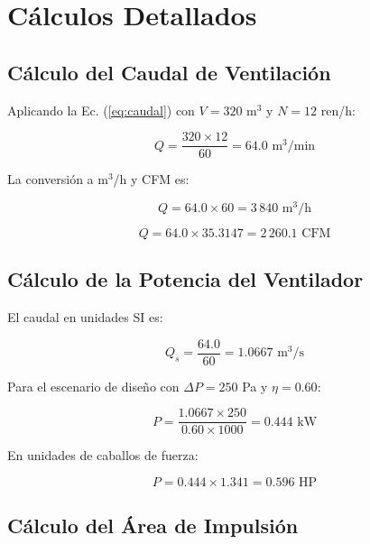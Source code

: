 \appendix
\section{Cálculos Detallados}
\label{appendix:calculations}

\subsection{Cálculo del Caudal de Ventilación}

Aplicando la Ec. (\ref{eq:caudal}) con $V = 320$ m$^3$ y $N = 12$ ren/h:

\begin{equation}
	Q = \frac{320 \times 12}{60} = 64.0 \text{ m}^3/\text{min}
\end{equation}

La conversión a m$^3$/h y CFM es:

\begin{equation}
	Q = 64.0 \times 60 = 3\,840 \text{ m}^3/\text{h}
\end{equation}

\begin{equation}
	Q = 64.0 \times 35.3147 = 2\,260.1 \text{ CFM}
\end{equation}

\subsection{Cálculo de la Potencia del Ventilador}

El caudal en unidades SI es:

\begin{equation}
	Q_s = \frac{64.0}{60} = 1.0667 \text{ m}^3/\text{s}
\end{equation}

Para el escenario de diseño con $\Delta P = 250$ Pa y $\eta = 0.60$:

\begin{equation}
	P = \frac{1.0667 \times 250}{0.60 \times 1000} = 0.444 \text{ kW}
\end{equation}

En unidades de caballos de fuerza:

\begin{equation}
	P = 0.444 \times 1.341 = 0.596 \text{ HP}
\end{equation}

\subsection{Cálculo del Área de Impulsión}

